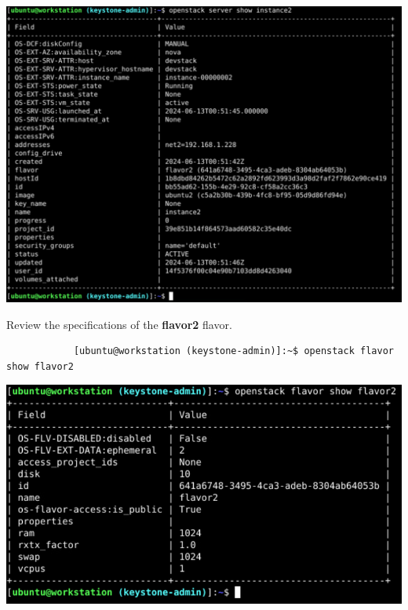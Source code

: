 \documentclass[letterpaper, 12pt]{article}
\begin{document}
\begin{enumerate}
\begin{labstep}
        \begin{center}
            \includegraphics[width=\linewidth]{images/part5/step3.png}
        \end{center}
    \end{labstep}

    \begin{labstep}
        Review the specifications of the \textbf{flavor2} flavor.
        \begin{lstlisting}
            [ubuntu@workstation (keystone-admin)]:~$ openstack flavor show flavor2
        \end{lstlisting}

        \begin{center}
            \includegraphics[width=\linewidth]{images/part5/step4.png}
        \end{center}
    \end{labstep}


\end{enumerate}
\end{document}
